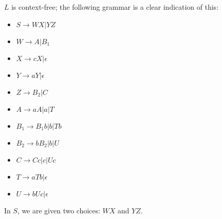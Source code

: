 \documentclass{article}
\begin{document}
\newpage

\(L\) is context-free; the following grammar is a clear indication of this:
\begin{itemize}
    \item \(S \to WX | YZ \)
    \item \(W \to A|B_1\)
    \item \(X \to cX|\epsilon\)
    \item \(Y \to aY|\epsilon\)
    \item \(Z \to B_2|C\)
    \item \(A \to aA|a|T\)
    \item \(B_1 \to B_1 b|b|Tb\)
    \item \(B_2 \to bB_2|b|U\)
    \item \(C \to Cc|c|Uc\)
    \item \(T \to aTb|\epsilon\)
    \item \(U \to bUc|\epsilon\)
\end{itemize}
In \(S\), we are given two choices: \(WX\) and \(YZ\).
\end{document}
